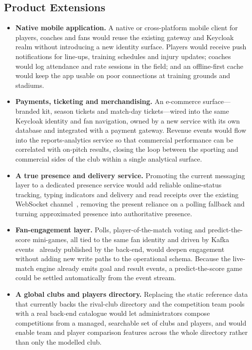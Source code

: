 \subsection{Product Extensions}

\begin{itemize}
  \item \textbf{Native mobile application.} A native or cross-platform mobile client
        for players, coaches and fans would reuse the existing gateway and Keycloak
        realm without introducing a new identity surface. Players would receive push
        notifications for line-ups, training schedules and injury updates; coaches would
        log attendance and rate sessions in the field; and an offline-first cache would
        keep the app usable on poor connections at training grounds and stadiums.

  \item \textbf{Payments, ticketing and merchandising.} An e-commerce surface---branded
        kit, season tickets and match-day tickets---wired into the same Keycloak
        identity and fan navigation, owned by a new service with its own database and
        integrated with a payment gateway. Revenue events would flow into the
        reports-analytics service so that commercial performance can be correlated with
        on-pitch results, closing the loop between the sporting and commercial sides of the
        club within a single analytical surface.

  \item \textbf{A true presence and delivery service.} Promoting the current messaging
        layer to a dedicated presence service would add reliable online-status tracking,
        typing indicators and delivery and read receipts over the existing WebSocket
        channel~\cite{websocket}, removing the present reliance on a polling fallback and
        turning approximated presence into authoritative presence.

  \item \textbf{Fan-engagement layer.} Polls, player-of-the-match voting and
        predict-the-score mini-games, all tied to the same fan identity and driven by
        Kafka events~\cite{kafka} already published by the back-end, would deepen
        engagement without adding new write paths to the operational schema. Because the
        live-match engine already emits goal and result events, a predict-the-score game
        could be settled automatically from the event stream.

  \item \textbf{A global clubs and players directory.} Replacing the static reference data
        that currently backs the rival-club directory and the competition team pools with a
        real back-end catalogue would let administrators compose competitions from a
        managed, searchable set of clubs and players, and would enable team and player
        comparison features across the whole directory rather than only the modelled club.


\end{itemize}
